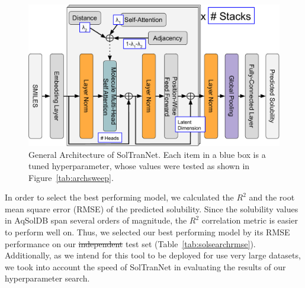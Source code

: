 \documentclass[journal=jcim,manuscript=applicationnotes]{achemso} %
\providecommand{\DIFaddtex}[1]{{\protect\color{blue}\uwave{#1}}} %
\providecommand{\DIFdeltex}[1]{{\protect\color{red}\sout{#1}}}                      %
\providecommand{\DIFaddbegin}{} %
\providecommand{\DIFaddend}{} %
\providecommand{\DIFdelbegin}{} %
\providecommand{\DIFdelend}{} %
\providecommand{\DIFadd}[1]{\texorpdfstring{\DIFaddtex{#1}}{#1}} %
\providecommand{\DIFdel}[1]{\texorpdfstring{\DIFdeltex{#1}}{}} %
\begin{document}
\begin{figure}[tb]
    \centering
    \includegraphics[width=0.7\linewidth]{figures/soltrannet_architecture.pdf}
    \caption{General Architecture of SolTranNet. Each item in a blue box is a tuned hyperparameter, whose values were tested as shown in Figure~\ref{tab:archsweep}.}
    \label{fig:architecture}
\end{figure}

In order to select the best performing model, we calculated the $R^2$ and the root mean square error (RMSE) of the predicted solubility.
Since the solubility values in AqSolDB span several orders of magnitude, the $R^2$ correlation metric is easier to perform well on.
Thus, we selected our best performing model by its RMSE performance on our \DIFdelbegin \DIFdel{independent }\DIFdelend \DIFaddbegin \DIFadd{withheld }\DIFaddend test set (Table~\ref{tab:solsearchrmse}).
Additionally, as we intend for this tool to be deployed for use very large datasets, we took into account the speed of SolTranNet in evaluating the results of our hyperparameter search. 
\end{document}
